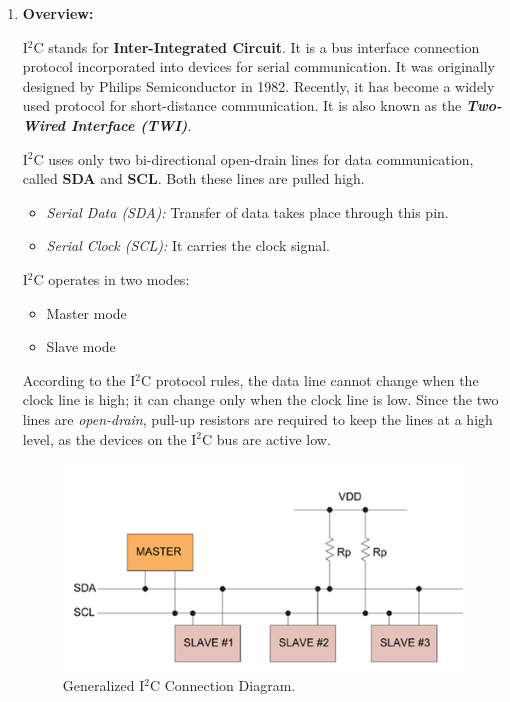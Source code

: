 \begin{enumerate}[label=\alph*) ]
	\item \textbf{Overview:}
	
	I$^2$C stands for \textbf{Inter-Integrated Circuit}. It is a bus interface connection protocol incorporated into devices for serial communication. It was originally designed by Philips Semiconductor in 1982. Recently, it has become a widely used protocol for short-distance communication. It is also known as the \textit{\textbf{Two-Wired Interface (TWI)}}.

	I$^2$C uses only two bi-directional open-drain lines for data communication, called \textbf{SDA} and \textbf{SCL}. Both these lines are pulled high.
	\begin{itemize}[label=-]
		\item \textit{Serial Data (SDA):} Transfer of data takes place through this pin.
		\item \textit{Serial Clock (SCL):} It carries the clock signal.
	\end{itemize}
	
	I$^2$C operates in two modes:
	\begin{itemize}[label=-]
		\item Master mode
		\item Slave mode
	\end{itemize}
	
	According to the I$^2$C protocol rules, the data line cannot change when the clock line is high; it can change only when the clock line is low. Since the two lines are \textit{open-drain}, pull-up resistors are required to keep the lines at a high level, as the devices on the I$^2$C bus are active low.
	
	\begin{figure}[H]
		\centering
		\includegraphics[width=.7\linewidth]{./my-chapters/my-images/theoretical_background/TWI_communication.png}
		\caption{Generalized I$^{2}$C Connection Diagram.}
		\label{fig: TWI protocol connection diagram}
	\end{figure}
	

\end{enumerate}

